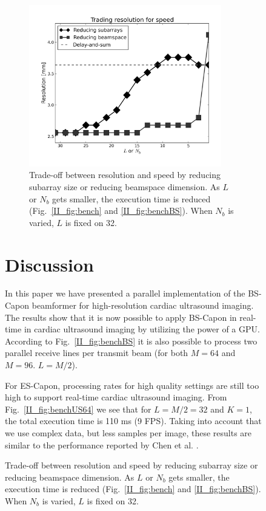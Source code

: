 \begin{figure}[!t]
\begin{figure}
\centering
\includegraphics[width=3.3in]{gfx/speed_res_trade.png}
\caption{Trade-off between resolution and speed by reducing subarray size or reducing beamspace dimension. As $L$ or $N_b$ gets smaller, the execution time is reduced (Fig.\ \ref{II_fig:bench} and \ref{II_fig:benchBS}). When $N_b$ is varied, $L$ is fixed on 32.}
\label{II_fig:speed_res_trade}
\end{figure}

\section{Discussion}\label{II_sec:dis}
In this paper we have presented a parallel implementation of the BS-Capon beamformer for high-resolution cardiac ultrasound imaging. The results show that it is now possible to apply BS-Capon in real-time in cardiac ultrasound imaging by utilizing the power of a GPU. According to Fig.\ \ref{II_fig:benchBS} it is also possible to process two parallel receive lines per transmit beam (for both $M=64$ and $M=96$. $L=M/2$). %

For ES-Capon, processing rates for high quality settings are still too high to support real-time cardiac ultrasound imaging. From Fig.\ \ref{II_fig:benchUS64} we see that for $L = M/2 = 32$ and $K=1$, the total execution time is 110 ms (9 FPS). Taking into account that we use complex data, but less samples per image, these results are similar to the performance reported by Chen et al. \cite{Chen2011}.


\end{figure}
